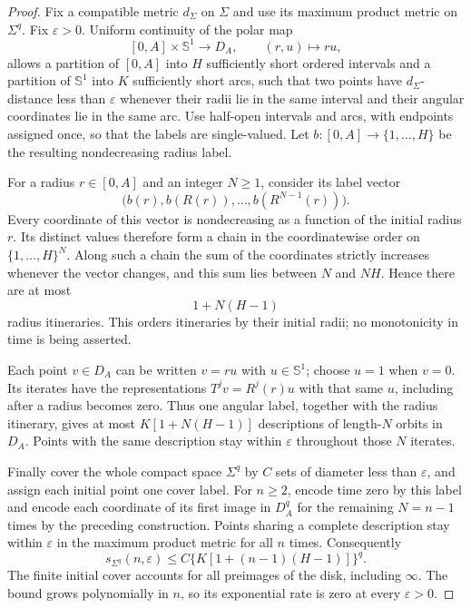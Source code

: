 \begin{proof}
Fix a compatible metric $d_\Sigma$ on $\Sigma$ and use its maximum
product metric on $\Sigma^q$.  Fix $\varepsilon>0$.  Uniform continuity
of the polar map
\[
  [0,A]\times\mathbb S^1\longrightarrow D_A,
  \qquad(r,u)\longmapsto ru,
\]
allows a partition of $[0,A]$ into $H$ sufficiently short ordered
intervals and a partition of $\mathbb S^1$ into $K$ sufficiently
short arcs, such that two points have $d_\Sigma$-distance less than
$\varepsilon$ whenever their radii lie in the same interval and their
angular coordinates lie in the same arc.
Use half-open intervals and arcs, with endpoints assigned once,
so that the labels are single-valued.  Let
$b:[0,A]\to\{1,\ldots,H\}$ be the resulting nondecreasing radius
label.

For a radius $r\in[0,A]$ and an integer $N\geq1$, consider its
label vector
\[
  \bigl(b(r),b(R(r)),\ldots,b(R^{N-1}(r))\bigr).
\]
Every coordinate of this vector is nondecreasing as a function of
the initial radius $r$.  Its distinct values therefore form a chain
in the coordinatewise order on $\{1,\ldots,H\}^N$.  Along such a
chain the sum of the coordinates strictly increases whenever the
vector changes, and this sum lies between $N$ and $NH$.  Hence there
are at most
\begin{equation}\label{eq:radius-itinerary-count}
  1+N(H-1)
\end{equation}
radius itineraries.  This orders itineraries by their initial
radii; no monotonicity in time is being asserted.

Each point $v\in D_A$ can be written $v=ru$ with $u\in\mathbb S^1$;
choose $u=1$ when $v=0$.  Its iterates have the representations
$T^jv=R^j(r)u$ with that same $u$, including after a radius becomes
zero.  Thus one angular label, together with the radius itinerary,
gives at most $K[1+N(H-1)]$ descriptions of length-$N$ orbits in
$D_A$.  Points with the same description stay within
$\varepsilon$ throughout those $N$ iterates.

Finally cover the whole compact space $\Sigma^q$ by $C$ sets of
diameter less than $\varepsilon$, and assign each initial point one
cover label.  For $n\geq2$, encode time zero by this label and
encode each coordinate of its first image in $D_A^q$ for the
remaining $N=n-1$ times by the preceding construction.  Points
sharing a complete description stay within $\varepsilon$ in the
maximum product metric for all $n$ times.  Consequently
\begin{equation}\label{eq:register-separated-count}
  s_{\Sigma^q}(n,\varepsilon)
  \leq C\bigl\{K[1+(n-1)(H-1)]\bigr\}^{q}.
\end{equation}
The finite initial cover accounts for all preimages of the disk,
including $\infty$.  The bound grows polynomially in $n$, so its
exponential rate is zero at every $\varepsilon>0$.
\end{proof}

